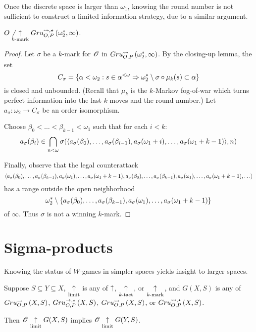 Once the discrete space is larger than $\omega_1$, knowing the round number
is not sufficient to construct a limited information strategy, due to a
similar argument.

\begin{thm}
  $O\not\underset{k\text{-mark}}{\uparrow}Gru_{O,P}^{\leadsto,\star}\left({\omega^*_2},{\infty}\right)$.
\end{thm}

\begin{proof}
  Let $\sigma$ be a $k$-mark for $\mathscr{O}$ in
  $Gru_{O,P}^{\leadsto}\left({\omega^*_2},{\infty}\right)$. By the closing-up lemma, the set
    \[
      C_\sigma
        =
      \{
        \alpha<\omega_2
          :
        s\in\alpha^{<\omega}
          \Rightarrow
        \omega^*_2\setminus\sigma\circ\mu_k(s)
        \subset \alpha
      \}
    \]
  is closed and unbounded. (Recall that $\mu_k$ is the
  $k$-Markov fog-of-war which turns perfect information into the last $k$
  moves and the round number.) Let $a_\sigma:\omega_2\to C_\sigma$ be
  an order isomorphism.

  Choose $\beta_0<\dots<\beta_{k-1}<\omega_1$ such that for each $i<k$:
    \[
      a_\sigma(\beta_i)
        \in
      \bigcap_{n<\omega}
      \sigma(
        \langle a_\sigma(\beta_0),\dots,a_\sigma(\beta_{i-1}),
          a_\sigma(\omega_1+i),\dots,a_\sigma(\omega_1+k-1)\rangle,
      n)
    \]

  Finally, observe that the legal counterattack
    \[
      \<a_\sigma(\beta_0),\dots,a_\sigma(\beta_{k-1}),
        a_\sigma(\omega_1),\dots,a_\sigma(\omega_1+k-1),
        a_\sigma(\beta_0),\dots,a_\sigma(\beta_{k-1}),
        a_\sigma(\omega_1),\dots,a_\sigma(\omega_1+k-1),
        \dots\>
    \]
  has a range outside the open neighborhood %
    \[
      \omega^*_2
        \setminus
      \{a_\sigma(\beta_0),\dots,a_\sigma(\beta_{k-1}),
        a_\sigma(\omega_1),\dots,a_\sigma(\omega_1+k-1)\}
    \]
  of $\infty$. Thus $\sigma$ is not a winning $k$-mark.
\end{proof}



\section{Sigma-products}

Knowing the status of $W$-games in simpler spaces yields insight to larger
spaces.

\begin{prop}
  Suppose $S\subseteq Y\subseteq X$, $\underset{\text{limit}}{\uparrow}$ is any of $\uparrow$,
  $\underset{k\text{-tact}}{\uparrow}$, or $\underset{k\text{-mark}}{\uparrow}$, and $G(X,S)$ is any of $Gru_{O,P}^{\to}\left({X},{S}\right)$,
  $Gru_{O,P}^{\to,\star}\left({X},{S}\right)$, $Gru_{O,P}^{\leadsto}\left({X},{S}\right)$, or $Gru_{O,P}^{\leadsto,\star}\left({X},{S}\right)$.

  Then $\mathscr{O} \underset{\text{limit}}{\uparrow} G(X,S)$ implies $\mathscr{O} \underset{\text{limit}}{\uparrow} G(Y,S)$.
\end{prop}

